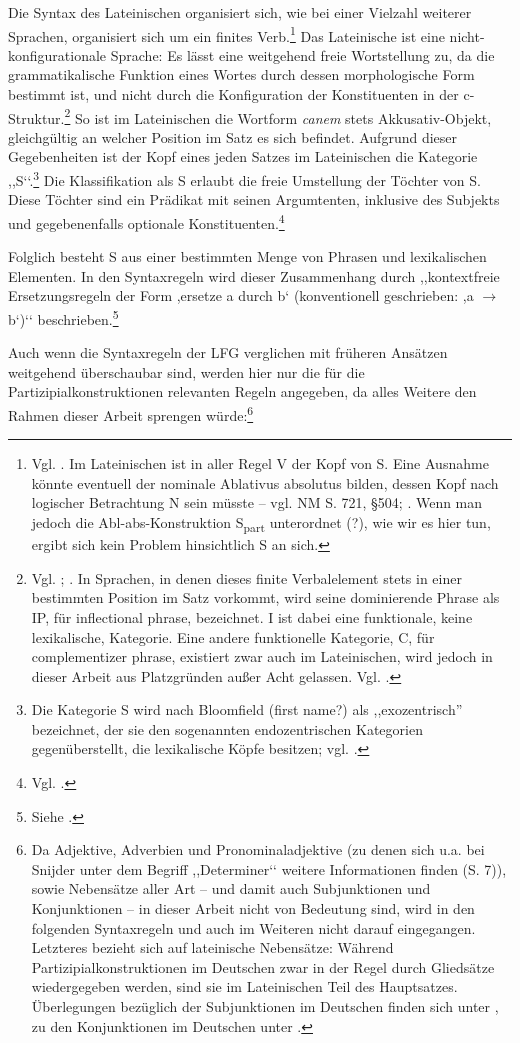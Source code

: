 \documentclass[12pt,a4paper]{article}
\begin{document}
Die Syntax des Lateinischen organisiert sich, wie bei einer Vielzahl weiterer Sprachen, organisiert sich um ein finites Verb.\footnote{Vgl. \cite[53]{Dal}. Im Lateinischen ist in aller Regel V der Kopf von S. Eine Ausnahme könnte eventuell der nominale Ablativus absolutus bilden, dessen Kopf nach logischer Betrachtung N sein müsste -- vgl. NM S. 721, §504; \cite[64]{Falk}. Wenn man jedoch die Abl-abs-Konstruktion S\textsubscript{part} unterordnet (?), wie wir es hier tun, ergibt sich kein Problem hinsichtlich S an sich.}
Das Lateinische ist eine nicht-konfigurationale Sprache: Es lässt eine weitgehend freie Wortstellung zu, da die grammatikalische Funktion eines Wortes durch dessen morphologische Form bestimmt ist, und nicht durch die Konfiguration der Konstituenten in der c-Struktur.\footnote{Vgl. \cite[19]{Rohrer}; \cite[65]{Dal}. In Sprachen, in denen dieses finite Verbalelement stets in einer bestimmten Position im Satz vorkommt, wird seine dominierende Phrase als IP, für inflectional phrase, bezeichnet. I ist dabei eine funktionale, keine lexikalische, Kategorie. Eine andere funktionelle Kategorie, C, für complementizer phrase, existiert zwar auch im Lateinischen, wird jedoch in dieser Arbeit aus Platzgründen außer Acht gelassen. Vgl. \cite[53; 65]{Dal}.} So ist im Lateinischen die Wortform \textit{canem} stets Akkusativ-Objekt, gleichgültig an welcher Position im Satz es sich befindet. Aufgrund dieser Gegebenheiten ist der Kopf eines jeden Satzes im Lateinischen die Kategorie ,,S‘‘.\footnote{Die Kategorie S wird nach Bloomfield (first name?) als ,,exozentrisch'' bezeichnet, der sie den sogenannten endozentrischen Kategorien gegenüberstellt, die lexikalische Köpfe besitzen; vgl. \cite[46]{Dal}.} Die Klassifikation als S erlaubt die freie Umstellung der Töchter von S. Diese Töchter sind ein Prädikat mit seinen Argumtenten, inklusive des Subjekts und gegebenenfalls optionale Konstituenten.\footnote{Vgl. \cite[64-65]{Dal}.}

Folglich besteht S aus einer bestimmten Menge von Phrasen und lexikalischen Elementen. In den Syntaxregeln wird dieser Zusammenhang durch ,,kontextfreie Ersetzungsregeln der Form ,ersetze a durch b‘ (konventionell geschrieben: ,a $\rightarrow$ b‘)‘‘ beschrieben.\footnote{Siehe \cite[18]{Rohrer}.}

Auch wenn die Syntaxregeln der LFG verglichen mit früheren Ansätzen weitgehend überschaubar sind, werden hier nur die für die Partizipialkonstruktionen relevanten Regeln angegeben, da alles Weitere den Rahmen dieser Arbeit sprengen würde:\footnote{Da Adjektive, Adverbien und Pronominaladjektive (zu denen sich u.a. bei Snijder unter dem Begriff ,,Determiner‘‘ weitere Informationen finden (S. 7)), sowie Nebensätze aller Art  -- und damit auch Subjunktionen und Konjunktionen -- in dieser Arbeit nicht von Bedeutung sind, wird in den folgenden Syntaxregeln und auch im Weiteren nicht darauf eingegangen. Letzteres bezieht sich auf lateinische Nebensätze: Während Partizipialkonstruktionen im Deutschen zwar in der Regel durch Gliedsätze wiedergegeben werden, sind sie im Lateinischen Teil des Hauptsatzes. Überlegungen bezüglich der Subjunktionen im Deutschen finden sich unter \cite[103-119]{Skript}, zu den Konjunktionen im Deutschen unter \cite[120-136]{Skript}.} 
\end{document}
